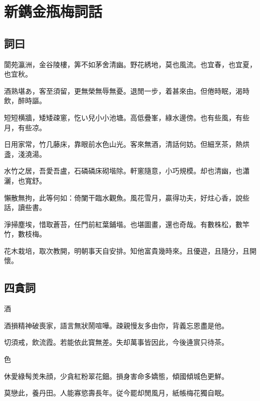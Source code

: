 \chapter*{新鐫金瓶梅詞話}


\section*{詞曰}

\begin{myquote0}
閬苑瀛洲，金谷陵樓，筭不如茅舍清幽。野花綉地，莫也風流。也宜春，也宜夏，也宜秋。

酒熟堪あ，客至須留，更無榮無辱無憂。退閒一步，着甚來由。但倦時眠，渴時飲，醉時謳。

短短横牆，矮矮疎窻，忔い兒小小池塘。高低疊峯，綠水邊傍。也有些風，有些月，有些凉。

日用家常，竹几藤床，靠眼前水色山光。客來無酒，清話何妨。但細烹茶，熱烘盞，淺澆湯。

水竹之居，吾愛吾盧，石磷磷床砌堦除。軒窻隨意，小巧規模。却也清幽，也瀟灑，也寬舒。

懶散無拘，此等何如：倚闌干臨水觀魚。風花雪月，贏得功夫，好炷心香，說些話，讀些書。

淨掃塵埃，惜取蒼苔，任門前紅葉鋪堦。也堪圖畫，還也奇哉。有數株松，數竿竹，數枝梅。

花木栽培，取次教開，明朝事天自安排。知他富貴幾時來。且優遊，且隨分，且開懷。
\end{myquote0}

\newpage\section*{四貪詞}

\hspace*{1em}酒

\begin{myquote0}
酒損精神破喪家，語言無狀鬧喧嘩。疎親慢友多由你，背義忘恩盡是他。

切須戒，飲流霞。若能依此寳無差。失却萬事皆因此，今後逄賔只待茶。
\end{myquote0}

\hspace*{1em}色

\begin{myquote0}
休愛綠髩羙朱顔，少貪紅粉翠花鈿。損身害命多嬌態，傾國傾城色更鮮。

莫戀此，養丹田。人能寡慾壽長年。従今罷却閒風月，紙帳梅花獨自眠。
\end{myquote0}

